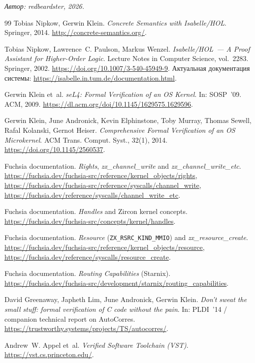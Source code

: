 \documentclass[11pt,a4paper]{article}
\begin{document}
\vspace{1.2em}
\noindent\textit{Автор: redbeardster, 2026.}

\begin{thebibliography}{99}
	Tobias Nipkow, Gerwin Klein.
	\textit{Concrete Semantics with Isabelle/HOL}.
	Springer, 2014.
	\url{http://concrete-semantics.org/}.

	Tobias Nipkow, Lawrence~C. Paulson, Markus Wenzel.
	\textit{Isabelle/HOL~--- A Proof Assistant for Higher-Order Logic}.
	Lecture Notes in Computer Science, vol.~2283. Springer, 2002.
	\url{https://doi.org/10.1007/3-540-45949-9}.
	Актуальная документация системы:
	\url{https://isabelle.in.tum.de/documentation.html}.

	Gerwin Klein et~al.
	\textit{seL4: Formal Verification of an OS Kernel}.
	In: SOSP~'09. ACM, 2009.
	\url{https://dl.acm.org/doi/10.1145/1629575.1629596}.

	Gerwin Klein, June Andronick, Kevin Elphinstone, Toby Murray,
	Thomas Sewell, Rafal Kolanski, Gernot Heiser.
	\textit{Comprehensive Formal Verification of an OS Microkernel}.
	ACM Trans. Comput. Syst., 32(1), 2014.
	\url{https://doi.org/10.1145/2560537}.

	Fuchsia documentation.
	\textit{Rights}, \textit{zx\_channel\_write} and \textit{zx\_channel\_write\_etc}.
	\url{https://fuchsia.dev/fuchsia-src/reference/kernel_objects/rights},
	\url{https://fuchsia.dev/fuchsia-src/reference/syscalls/channel_write},
	\url{https://fuchsia.dev/reference/syscalls/channel_write_etc}.

	Fuchsia documentation.
	\textit{Handles} and Zircon kernel concepts.
	\url{https://fuchsia.dev/fuchsia-src/concepts/kernel/handles}.

	Fuchsia documentation.
	\textit{Resource} (\texttt{ZX\_RSRC\_KIND\_MMIO}) and
	\textit{zx\_resource\_create}.
	\url{https://fuchsia.dev/fuchsia-src/reference/kernel_objects/resource},
	\url{https://fuchsia.dev/reference/syscalls/resource_create}.

	Fuchsia documentation.
	\textit{Routing Capabilities} (Starnix).
	\url{https://fuchsia.dev/fuchsia-src/development/starnix/routing_capabilities}.

	David Greenaway, Japheth Lim, June Andronick, Gerwin Klein.
	\textit{Don't sweat the small stuff: formal verification of C code
		without the pain}.
	In: PLDI~'14 / companion technical report on AutoCorres.
	\url{https://trustworthy.systems/projects/TS/autocorres/}.

	Andrew~W. Appel et~al.
	\textit{Verified Software Toolchain (VST)}.
	\url{https://vst.cs.princeton.edu/}.
\end{thebibliography}
\end{document}
